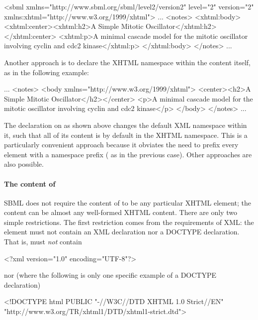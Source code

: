 \begin{example}
<sbml xmlns="http://www.sbml.org/sbml/level2/version2" level="2" version="2"
      xmlns:xhtml="http://www.w3.org/1999/xhtml">
  ...
  <notes>
    <xhtml:body>
      <xhtml:center><xhtml:h2>A Simple Mitotic Oscillator</xhtml:h2></xhtml:center>
      <xhtml:p>A minimal cascade model for the mitotic oscillator
      involving cyclin and cdc2 kinase</xhtml:p>
    </xhtml:body>
  </notes>
  ...
\end{example}

Another approach is to declare the XHTML namespace within the
 content itself, as in the following example:

\begin{example}
...
<notes>
  <body xmlns="http://www.w3.org/1999/xhtml">
    <center><h2>A Simple Mitotic Oscillator</h2></center>
    <p>A minimal cascade model for the mitotic oscillator
    involving cyclin and cdc2 kinase</p>
  </body>
</notes>
...
\end{example}

The  declaration on
 as shown above changes the default XML namespace
within it, such that all of its content is by default in the XHTML
namespace.  This is a particularly convenient approach because it
obviates the need to prefix every element with a namespace prefix
(\eg {} as in the previous case).  Other
approaches are also possible.


\paragraph{The content of }

SBML does not require the content of  to be any
particular XHTML element; the content can be almost any
well-formed XHTML content.  There are only two simple
restrictions.  The first restriction comes from the requirements
of XML: the  element must not contain an XML
declaration nor a DOCTYPE declaration.  That is, 
must \emph{not} contain

\begin{example}
<?xml version="1.0" encoding="UTF-8"?>  
\end{example}

nor (where the following is only one specific example of a
DOCTYPE declaration)

\begin{example}
<!DOCTYPE html PUBLIC "-//W3C//DTD XHTML 1.0 Strict//EN"
 "http://www.w3.org/TR/xhtml1/DTD/xhtml1-strict.dtd">
\end{example}

